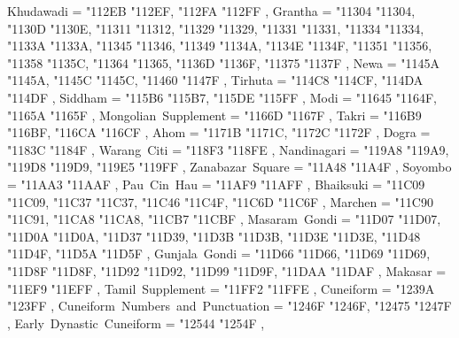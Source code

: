 {    Khudawadi                                      = { {"112EB} {"112EF}, {"112FA} {"112FF} },
    Grantha                                        = { {"11304} {"11304}, {"1130D} {"1130E}, {"11311} {"11312}, {"11329} {"11329}, {"11331} {"11331}, {"11334} {"11334}, {"1133A} {"1133A}, {"11345} {"11346}, {"11349} {"1134A}, {"1134E} {"1134F}, {"11351} {"11356}, {"11358} {"1135C}, {"11364} {"11365}, {"1136D} {"1136F}, {"11375} {"1137F} },
    Newa                                           = { {"1145A} {"1145A}, {"1145C} {"1145C}, {"11460} {"1147F} },
    Tirhuta                                        = { {"114C8} {"114CF}, {"114DA} {"114DF} },
    Siddham                                        = { {"115B6} {"115B7}, {"115DE} {"115FF} },
    Modi                                           = { {"11645} {"1164F}, {"1165A} {"1165F} },
    Mongolian~Supplement                           = { {"1166D} {"1167F} },
    Takri                                          = { {"116B9} {"116BF}, {"116CA} {"116CF} },
    Ahom                                           = { {"1171B} {"1171C}, {"1172C} {"1172F} },
    Dogra                                          = { {"1183C} {"1184F} },
    Warang~Citi                                    = { {"118F3} {"118FE} },
    Nandinagari                                    = { {"119A8} {"119A9}, {"119D8} {"119D9}, {"119E5} {"119FF} },
    Zanabazar~Square                               = { {"11A48} {"11A4F} },
    Soyombo                                        = { {"11AA3} {"11AAF} },
    Pau~Cin~Hau                                    = { {"11AF9} {"11AFF} },
    Bhaiksuki                                      = { {"11C09} {"11C09}, {"11C37} {"11C37}, {"11C46} {"11C4F}, {"11C6D} {"11C6F} },
    Marchen                                        = { {"11C90} {"11C91}, {"11CA8} {"11CA8}, {"11CB7} {"11CBF} },
    Masaram~Gondi                                  = { {"11D07} {"11D07}, {"11D0A} {"11D0A}, {"11D37} {"11D39}, {"11D3B} {"11D3B}, {"11D3E} {"11D3E}, {"11D48} {"11D4F}, {"11D5A} {"11D5F} },
    Gunjala~Gondi                                  = { {"11D66} {"11D66}, {"11D69} {"11D69}, {"11D8F} {"11D8F}, {"11D92} {"11D92}, {"11D99} {"11D9F}, {"11DAA} {"11DAF} },
    Makasar                                        = { {"11EF9} {"11EFF} },
    Tamil~Supplement                               = { {"11FF2} {"11FFE} },
    Cuneiform                                      = { {"1239A} {"123FF} },
    Cuneiform~Numbers~and~Punctuation              = { {"1246F} {"1246F}, {"12475} {"1247F} },
    Early~Dynastic~Cuneiform                       = { {"12544} {"1254F} },
}

